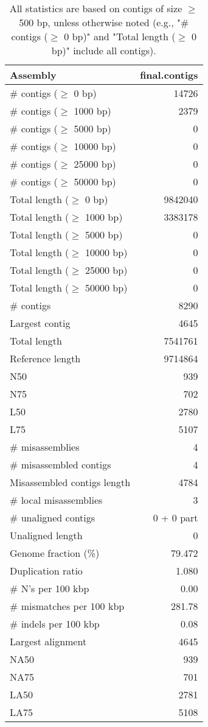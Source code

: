 \documentclass[12pt,a4paper]{article}
\begin{document}
\begin{table}[ht]
\begin{center}
\caption{All statistics are based on contigs of size $\geq$ 500 bp, unless otherwise noted (e.g., "\# contigs ($\geq$ 0 bp)" and "Total length ($\geq$ 0 bp)" include all contigs).}
\begin{tabular}{|l*{1}{|r}|}
\hline
Assembly & final.contigs \\ \hline
\# contigs ($\geq$ 0 bp) & 14726 \\ \hline
\# contigs ($\geq$ 1000 bp) & 2379 \\ \hline
\# contigs ($\geq$ 5000 bp) & 0 \\ \hline
\# contigs ($\geq$ 10000 bp) & 0 \\ \hline
\# contigs ($\geq$ 25000 bp) & 0 \\ \hline
\# contigs ($\geq$ 50000 bp) & 0 \\ \hline
Total length ($\geq$ 0 bp) & 9842040 \\ \hline
Total length ($\geq$ 1000 bp) & 3383178 \\ \hline
Total length ($\geq$ 5000 bp) & 0 \\ \hline
Total length ($\geq$ 10000 bp) & 0 \\ \hline
Total length ($\geq$ 25000 bp) & 0 \\ \hline
Total length ($\geq$ 50000 bp) & 0 \\ \hline
\# contigs & 8290 \\ \hline
Largest contig & 4645 \\ \hline
Total length & 7541761 \\ \hline
Reference length & 9714864 \\ \hline
N50 & 939 \\ \hline
N75 & 702 \\ \hline
L50 & 2780 \\ \hline
L75 & 5107 \\ \hline
\# misassemblies & 4 \\ \hline
\# misassembled contigs & 4 \\ \hline
Misassembled contigs length & 4784 \\ \hline
\# local misassemblies & 3 \\ \hline
\# unaligned contigs & 0 + 0 part \\ \hline
Unaligned length & 0 \\ \hline
Genome fraction (\%) & 79.472 \\ \hline
Duplication ratio & 1.080 \\ \hline
\# N's per 100 kbp & 0.00 \\ \hline
\# mismatches per 100 kbp & 281.78 \\ \hline
\# indels per 100 kbp & 0.08 \\ \hline
Largest alignment & 4645 \\ \hline
NA50 & 939 \\ \hline
NA75 & 701 \\ \hline
LA50 & 2781 \\ \hline
LA75 & 5108 \\ \hline
\end{tabular}
\end{center}
\end{table}
\end{document}
